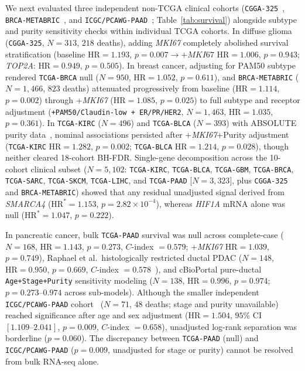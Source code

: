 \documentclass[11pt]{article}
\begin{document}
We next evaluated three independent non-TCGA clinical cohorts (\texttt{CGGA-325}~\cite{cgga2021}, \texttt{BRCA-METABRIC}~\cite{curtis2012}, and \texttt{ICGC/PCAWG-PAAD}~\cite{pcawg2020}; Table~\ref{tab:survival}) alongside subtype and purity sensitivity checks within individual TCGA cohorts. In diffuse glioma (\texttt{CGGA-325}, $N = 313$, $218$ deaths), adding \textit{MKI67} completely abolished survival stratification (baseline $\text{HR} = 1.193$, $p = 0.007 \rightarrow +\textit{MKI67}$ $\text{HR} = 1.006$, $p = 0.943$; \textit{TOP2A}: $\text{HR} = 0.949$, $p = 0.505$). In breast cancer, adjusting for PAM50 subtype rendered \texttt{TCGA-BRCA} null ($N = 950$, $\text{HR} = 1.052$, $p = 0.611$), and \texttt{BRCA-METABRIC} ($N = 1,466$, $823$ deaths) attenuated progressively from baseline ($\text{HR} = 1.114$, $p = 0.002$) through +\textit{MKI67} ($\text{HR} = 1.085$, $p = 0.025$) to full subtype and receptor adjustment (\texttt{+PAM50/Claudin-low + ER/PR/HER2}, $N = 1,463$, $\text{HR} = 1.035$, $p = 0.361$). In \texttt{TCGA-KIRC} ($N = 496$) and \texttt{TCGA-BLCA} ($N = 393$) with ABSOLUTE purity data~\cite{carter2012}, nominal associations persisted after +\textit{MKI67}+Purity adjustment (\texttt{TCGA-KIRC} $\text{HR} = 1.282$, $p = 0.002$; \texttt{TCGA-BLCA} $\text{HR} = 1.214$, $p = 0.028$), though neither cleared 18-cohort BH-FDR. Single-gene decomposition across the 10-cohort clinical subset ($N = 5,102$: \texttt{TCGA-KIRC}, \texttt{TCGA-BLCA}, \texttt{TCGA-GBM}, \texttt{TCGA-BRCA}, \texttt{TCGA-SARC}, \texttt{TCGA-SKCM}, \texttt{TCGA-LIHC}, and \texttt{TCGA-PAAD} [$N = 3,323$], plus \texttt{CGGA-325} and \texttt{BRCA-METABRIC}) showed that any residual unadjusted signal derived from \textit{SMARCA4} ($\text{HR}^* = 1.153$, $p = 2.82 \times 10^{-4}$), whereas \textit{HIF1A} mRNA alone was null ($\text{HR}^* = 1.047$, $p = 0.222$).

In pancreatic cancer, bulk \texttt{TCGA-PAAD} survival was null across complete-case ($N = 168$, $\text{HR} = 1.143$, $p = 0.273$, $C$-index $= 0.579$; +\textit{MKI67} $\text{HR} = 1.039$, $p = 0.749$), Raphael et al.\ histologically restricted ductal PDAC ($N = 148$, $\text{HR} = 0.950$, $p = 0.669$, $C$-index $= 0.578$~\cite{raphael2017}), and cBioPortal pure-ductal \texttt{Age+Stage+Purity} sensitivity modeling ($N = 138$, $\text{HR} = 0.996$, $p = 0.974$; $p = 0.273\text{--}0.974$ across sub-models). Although the smaller independent \texttt{ICGC/PCAWG-PAAD} cohort~\cite{pcawg2020} ($N = 71$, $48$ deaths; stage and purity unavailable) reached significance after age and sex adjustment ($\text{HR} = 1.504$, $95\%$ CI $[1.109\text{--}2.041]$, $p = 0.009$, $C$-index $= 0.658$), unadjusted log-rank separation was borderline ($p = 0.060$). The discrepancy between \texttt{TCGA-PAAD} (null) and \texttt{ICGC/PCAWG-PAAD} ($p = 0.009$, unadjusted for stage or purity) cannot be resolved from bulk RNA-seq alone.
\end{document}
